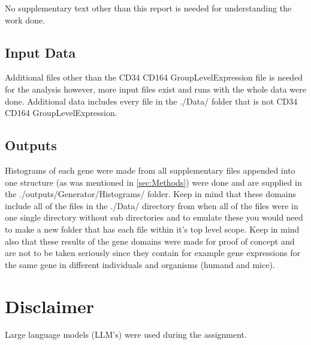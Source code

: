 \documentclass[12pt, a4paper]{article}
\begin{document}
\begin{multicols}{2}
                No supplementary text other than this report is needed for understanding the work done.
                \newline


            \subsection{Input Data}\label{sub:Input Data} %

                Additional files other than the CD34 CD164 GroupLevelExpression file is needed for the analysis however, more input files exist and runs with the whole data were done. Additional data includes every file in the ./Data/ folder that is not CD34 CD164 GroupLevelExpression.
                \newline


            \subsection{Outputs}\label{sub:Outputs} %

                Histograms of each gene were made from all supplementary files appended into one structure (as was mentioned in \ref{sec:Methods}) were done and are supplied in the ./outputs/Generator/Histograms/ folder. Keep in mind that these domains include all of the files in the ./Data/ directory from when all of the files were in one single directory without sub directories and to emulate these you would need to make a new folder that has each file within it's top level scope. Keep in mind also that these results of the gene domains were made for proof of concept and are not to be taken seriously since they contain for example gene expressions for the same gene in different individuals and organisms (humand and mice).
                \newline



        \section{Disclaimer}\label{sec:Disclaimer} %

            Large language models (LLM's) were used during the assignment.


\end{multicols}
\end{document}

